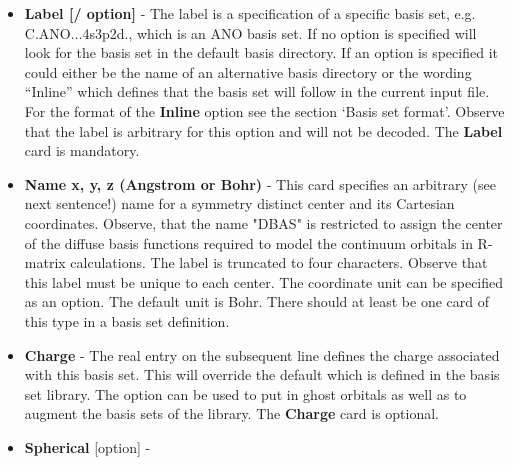 \begin{keywordlist}
\begin{itemize}
\item {\bf Label [/ option]} -{}
The label is a specification of a specific basis set, e.g.
C.ANO$\ldots$4s3p2d., which is an ANO basis set.
If no option is specified
 will look for the basis
set in the default basis directory. If an option is specified it
could either be the name of an alternative basis directory or
the wording ``Inline'' which defines
that the basis set will follow in the current input
file. For the format of the
{\bf Inline} option see the section
`Basis set format'. Observe that the label is arbitrary for this
option and will not be decoded.
The {\bf Label} card is mandatory.
%
\item {\bf Name x, y, z (Angstrom or Bohr)} -{}
This card specifies an arbitrary (see next sentence!) name
for a symmetry distinct center and its Cartesian coordinates.
Observe, that the
name "DBAS" is restricted to assign the center of the
diffuse basis functions required to model the continuum
orbitals in R-matrix calculations.
The label is truncated to four characters. Observe that this
label must be unique to each center. The coordinate unit can
be specified as an option. The default unit is Bohr.
There should at least be one card of this type in a basis set
definition.
%
\item {\bf Charge} -{}
The real entry on the subsequent line defines
the charge associated with
this basis set. This will override the default which is defined in
the basis set library. The option can be used to put in ghost
orbitals as well as to augment the basis sets of the library.
The {\bf Charge} card is optional.
%
\item {\bf Spherical} [option] -{}

\end{itemize}
\end{keywordlist}
